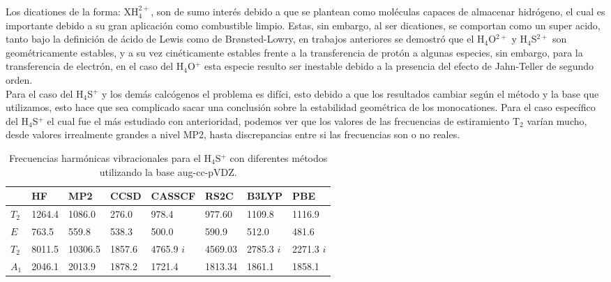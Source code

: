 \documentclass[12pt]{report}
\begin{document}
Los dicationes de la forma: XH$_4^{2+}$, son de sumo interés debido a que se plantean como moléculas capaces de almacenar hidrógeno, el cual es importante debido a su gran aplicación como combustible limpio. Estas, sin embargo, al ser dicationes, se comportan como un super acido, tanto bajo la definición de ácido de Lewis como de Br\o nsted-Lowry, en trabajos anteriores\cite{Alonso} se demostró que el H$_4$O$^{2+}$ y H$_4$S$^{2+}$ son geométricamente estables, y a su vez cinéticamente estables frente a la transferencia de protón a algunas especies, sin embargo, para la transferencia de electrón, en el caso del H$_4$O$^+$ esta especie resulto ser inestable debido a la presencia del efecto de Jahn-Teller de segundo orden.
\\


Para el caso del H$_4$S$^+$ y los demás calcógenos el problema es difíci, esto debido a que los resultados cambiar según el método y la base que utilizamos, esto hace que sea complicado sacar una conclusión sobre la estabilidad geométrica de los monocationes. Para el caso específico del H$_4$S$^+$ el cual fue el más estudiado con anterioridad, podemos ver que los valores de las frecuencias de estiramiento T$_2$ varían mucho, desde valores irrealmente grandes a nivel MP2, hasta discrepancias entre si las frecuencias son o no reales.
\\




\begin{table}[H]
\centering
\begin{tabular}{l|lllllll}
\hline
 & HF & MP2 & CCSD & CASSCF &RS2C & B3LYP & PBE   \\ \hline
$T_2$ & 1264.4 & 1086.0  & 276.0 & 978.4 &977.60  &1109.8 &  1116.9 \\
$E$  &  763.5 & 559.8 & 538.3  & 500.0 & 590.9 & 512.0 &481.6  \\
$T_2$  & 8011.5 & 10306.5 &1857.6  & 4765.9 $i$  & 4569.03 & 2785.3 $i$ &  2271.3 $i$\\
$A_1$  & 2046.1 & 2013.9 & 1878.2 & 1721.4 &1813.34 &1861.1  & 1858.1\\ \hline
\end{tabular}
\caption{Frecuencias harmónicas vibracionales para el H$_4$S$^+$ con diferentes métodos utilizando la base aug-cc-pVDZ.}
\label{hipotesistabla}
\end{table}

\newpage
\end{document}
